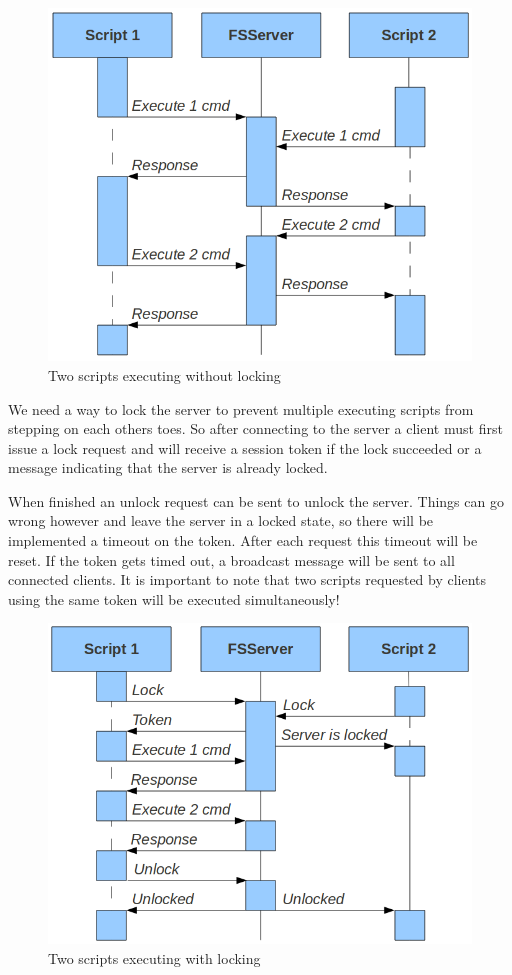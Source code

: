 \begin{figure}[h!] \centering
	\includegraphics[scale=0.5]{img/multiple_scripts_no_lock}
  \caption{Two scripts executing without locking}
\end{figure}

We need a way to lock the server to prevent multiple executing scripts from stepping on each others toes. So after connecting to the server a client must first issue a lock request and will receive a session token if the lock succeeded or a message indicating that the server is already locked.

When finished an unlock request can be sent to unlock the server. Things can go wrong however and leave the server in a locked state, so there will be implemented a timeout on the token. After each request this timeout will be reset. If the token gets timed out, a broadcast message will be sent to all connected clients.
It is important to note that two scripts requested by clients using the same token will be executed simultaneously!

\begin{figure}[h!] \centering
	\includegraphics[scale=0.5]{img/lock}
  \caption{Two scripts executing with locking}
\end{figure}

